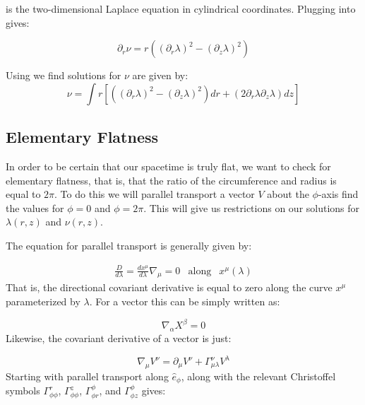 \documentclass{article}
\begin{document}
 is the two-dimensional Laplace equation in cylindrical coordinates. Plugging  into  gives:

\begin{equation}
\partial_{r}\nu=r\left(\left(\partial_{r}\lambda\right)^{2}-\left(\partial_{z}\lambda\right)^{2}\right)\label{eq:nu_r}
\end{equation}

Using  we find solutions for $\nu$ are given by:
\begin{equation}
\nu=\int r[\left(\left(\partial_{r}\lambda\right)^{2}-\left(\partial_{z}\lambda\right)^{2}\right)dr+\left(2\partial_{r}\lambda\partial_{z}\lambda\right)dz]\label{eq:nu}
\end{equation}

\subsection{Elementary Flatness}

In order to be certain that our spacetime is truly flat, we want to
check for elementary flatness, that is, that the ratio of the
circumference and radius is equal to $2\pi$. To do this we will
parallel transport a vector $V$ about the $\phi$-axis find the values
for $\phi=0$ and $\phi=2\pi$. This will give us restrictions on our solutions for $\lambda\left(r,z\right)$ and $\nu\left(r,z\right)$.

The equation for parallel transport is generally given by:
  	
\begin{equation}
\begin{array}{rcl} \frac{D}{d\lambda}=\frac{dx^{\mu}}{d\lambda}\nabla_{\mu}=0 & \mbox{along} & x^{\mu}\left(\lambda\right)	  	
\end{array}
\end{equation}	  	
That is, the directional covariant derivative is equal to zero along the curve $x^{\mu}$ parameterized by $\lambda$. For a vector this can be simply written as:
	  	
\begin{equation}
\nabla_{\alpha}X^{\beta}=0\label{eq:x-par-xport}
\end{equation}
Likewise, the covariant derivative of a vector is just:

\begin{equation}
\nabla_\mu V^{\nu}=\partial_\mu V^\nu+\Gamma^\nu_{\mu\lambda} V^\lambda
\end{equation}	  	
Starting with parallel transport along $\hat{e}_{\phi}$,  along with the relevant Christoffel symbols $\Gamma^{r}_{\phi\phi}$, $\Gamma^{z}_{\phi\phi}$, $\Gamma^{\phi}_{\phi r}$, and $\Gamma^{\phi}_{\phi z}$ gives:
	  	
\end{document}
